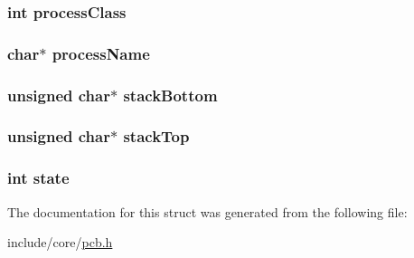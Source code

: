 \subsubsection[{\texorpdfstring{process\+Class}{processClass}}]{\setlength{\rightskip}{0pt plus 5cm}int process\+Class}\hypertarget{structpcb_a616049b77d5f877f7cd6633f6c421d63}{}\label{structpcb_a616049b77d5f877f7cd6633f6c421d63}
\subsubsection[{\texorpdfstring{process\+Name}{processName}}]{\setlength{\rightskip}{0pt plus 5cm}char$\ast$ process\+Name}\hypertarget{structpcb_a87501b25e6cc00b44c763d563ff56feb}{}\label{structpcb_a87501b25e6cc00b44c763d563ff56feb}
\subsubsection[{\texorpdfstring{stack\+Bottom}{stackBottom}}]{\setlength{\rightskip}{0pt plus 5cm}unsigned char$\ast$ stack\+Bottom}\hypertarget{structpcb_a02a92960d9b4b330869e1a7bf123f771}{}\label{structpcb_a02a92960d9b4b330869e1a7bf123f771}
\subsubsection[{\texorpdfstring{stack\+Top}{stackTop}}]{\setlength{\rightskip}{0pt plus 5cm}unsigned char$\ast$ stack\+Top}\hypertarget{structpcb_a4570bd19470baff144028696fa01628c}{}\label{structpcb_a4570bd19470baff144028696fa01628c}
\subsubsection[{\texorpdfstring{state}{state}}]{\setlength{\rightskip}{0pt plus 5cm}int state}\hypertarget{structpcb_a89f234133d3efe315836311cbf21c64b}{}\label{structpcb_a89f234133d3efe315836311cbf21c64b}


The documentation for this struct was generated from the following file\+:\begin{DoxyCompactItemize}
\item 
include/core/\hyperlink{pcb_8h}{pcb.\+h}\end{DoxyCompactItemize}
